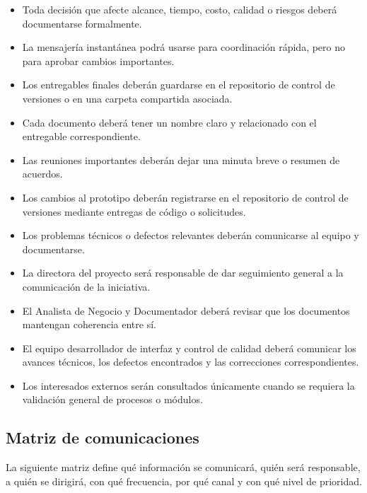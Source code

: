\documentclass[11pt,spanish]{article}
\begin{document}
\begin{itemize}
    \item Toda decisión que afecte alcance, tiempo, costo, calidad o riesgos deberá documentarse formalmente.
    \item La mensajería instantánea podrá usarse para coordinación rápida, pero no para aprobar cambios importantes.
    \item Los entregables finales deberán guardarse en el repositorio de control de versiones o en una carpeta compartida asociada.
    \item Cada documento deberá tener un nombre claro y relacionado con el entregable correspondiente.
    \item Las reuniones importantes deberán dejar una minuta breve o resumen de acuerdos.
    \item Los cambios al prototipo deberán registrarse en el repositorio de control de versiones mediante entregas de código o solicitudes.
    \item Los problemas técnicos o defectos relevantes deberán comunicarse al equipo y documentarse.
    \item La directora del proyecto será responsable de dar seguimiento general a la comunicación de la iniciativa.
    \item El Analista de Negocio y Documentador deberá revisar que los documentos mantengan coherencia entre sí.
    \item El equipo desarrollador de interfaz y control de calidad deberá comunicar los avances técnicos, los defectos encontrados y las correcciones correspondientes.
    \item Los interesados externos serán consultados únicamente cuando se requiera la validación general de procesos o módulos.
\end{itemize}

\subsection{Matriz de comunicaciones}

La siguiente matriz define qué información se comunicará, quién será responsable, a quién se dirigirá, con qué frecuencia, por qué canal y con qué nivel de prioridad.
\end{document}
